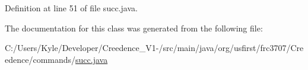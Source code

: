 Definition at line 51 of file succ.\+java.



The documentation for this class was generated from the following file\+:\begin{DoxyCompactItemize}
\item 
C\+:/\+Users/\+Kyle/\+Developer/\+Creedence\+\_\+\+V1-\//src/main/java/org/usfirst/frc3707/\+Creedence/commands/\mbox{\hyperlink{succ_8java}{succ.\+java}}\end{DoxyCompactItemize}
